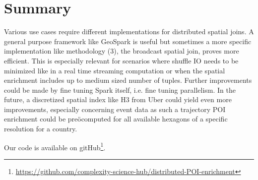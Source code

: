 \documentclass[conference]{IEEEtran}
\begin{document}
\section{Summary}
Various use cases require different implementations for distributed spatial joins.
A general purpose framework like GeoSpark is useful but sometimes a more specific implementation like methodology (3), the broadcast spatial join, proves more efficient.
This is especially relevant for scenarios where shuffle IO needs to be minimized like in a real time streaming computation or when the  spatial enrichment includes up to medium sized number of tuples.
Further improvements could be made by fine tuning Spark itself, i.e. fine tuning parallelism.
In the future, a discretized spatial index like H3 from Uber\cite{uber_h3} could yield even more improvements, especially concerning event data as such a trajectory POI enrichment could be preöcomputed for all available hexagons of a specific resolution for a country.


Our code is available on gitHub\footnote{\url{https://github.com/complexity-science-hub/distributed-POI-enrichment}}.

\printbibliography
\end{document}
